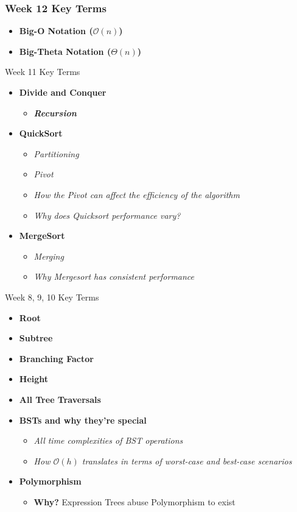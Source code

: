 \documentclass[hyperref={colorlinks,citecolor=blue,linkcolor=blue,urlcolor=blue}, aspectratio=1610]{beamer}
\begin{document}
\begin{frame}
  \frametitle{Week 12 Key Terms}
  \begin{itemize} 

    \item \textbf{Big-O Notation ($\mathcal{O}(n)$)}
    \item \textbf{Big-Theta Notation ($\Theta(n)$)}
  \end{itemize}  
\end{frame}

\begin{frame}{Week 11 Key Terms}
  \begin{itemize}
    \item \textbf{Divide and Conquer} 
    \begin{itemize}
        \item \textit{\textbf{Recursion}}
    \end{itemize}
    \pause
    \item \textbf{QuickSort}
    \begin{itemize}
        \item \textit{Partitioning}
        \item \textit{Pivot}
        \item \textit{How the Pivot can affect the efficiency of the algorithm}
        \item \textit{Why does Quicksort performance vary?}
    \end{itemize}
    \pause
    \item \textbf{MergeSort}
    \begin{itemize}
      \item \textit{Merging}
      \item \textit{Why Mergesort has consistent performance}
    \end{itemize}
  \end{itemize}
\end{frame}

\begin{frame}{Week 8, 9, 10 Key Terms}
  \begin{itemize}
    \item \textbf{Root} 
    \item \textbf{Subtree} 
    \item \textbf{Branching Factor}
    \item \textbf{Height}
    \item \textbf{All Tree Traversals}
    \item \textbf{BSTs and why they're special}
    \begin{itemize}
      \item \textit{All time complexities of BST operations}
      \item \textit{How $\mathcal{O}(h)$ translates in terms of worst-case and best-case scenarios}
    \end{itemize}
  \item \textbf{Polymorphism}
  \begin{itemize}
    \item \textbf{Why?} Expression Trees abuse Polymorphism to exist
  \end{itemize}
  \end{itemize}
\end{frame}
\end{document}
